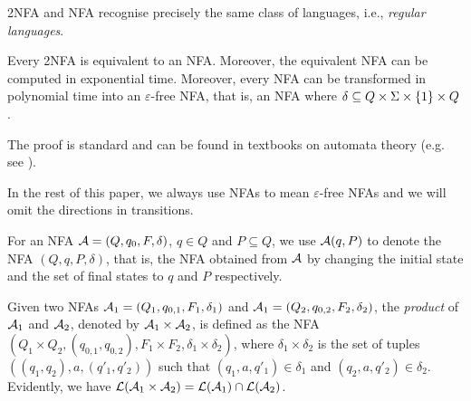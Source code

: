 2NFA and NFA recognise precisely the same class of languages, i.e., 
\emph{regular languages}. 

\begin{proposition}
	Every 2NFA is equivalent to an NFA. Moreover, the equivalent
    NFA can be computed in exponential time. Moreover, every NFA can be transformed in polynomial time into an $\varepsilon$-free NFA, that is, an NFA where $\delta\subseteq Q \times \Sigma\times   \{1\} \times Q $.
\end{proposition}

The proof is standard and can be found in textbooks on automata theory
(e.g. see \cite{Kozen-automata}). 

In the rest of this paper, we always use NFAs to mean $\varepsilon$-free NFAs and we will omit the directions in transitions.

For an NFA $\mathcal{A}=(Q, q_0, F, \delta)$, $q \in Q$ and $P \subseteq Q$, we use $\mathcal{A}(q, P)$ to denote the NFA $(Q, q, P, \delta)$, that is, the NFA obtained from $\mathcal{A}$ by changing the initial state and the set of final states to $q$ and $P$ respectively.

Given two NFAs $\mathcal{A}_1 = (Q_1, q_{0,1}, F_{1}, \delta_1)$ and $\mathcal{A}_1 = (Q_2, q_{0,2}, F_2, \delta_2)$, the \emph{product} of $\mathcal{A}_1$ and $\mathcal{A}_2$, denoted by $\mathcal{A}_1 \times \mathcal{A}_2$, is defined as the NFA $(Q_1 \times Q_2, (q_{0,1}, q_{0,2}), F_1 \times F_2, \delta_1 \times \delta_2)$, where $\delta_1 \times \delta_2$ is the set of tuples $((q_1,q_2), a, (q'_1, q'_2))$ such that $(q_1, a, q'_1) \in \delta_1$ and $(q_2, a, q'_2) \in \delta_2$. Evidently, we have $\mathcal{L}(\mathcal{A}_1 \times \mathcal{A}_2) = \mathcal{L}(\mathcal{A}_1) \cap \mathcal{L}(\mathcal{A}_2)$.




 
 

